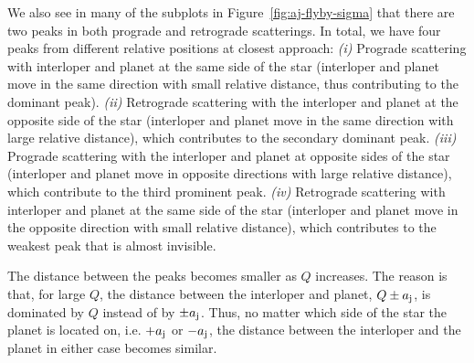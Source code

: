 \documentclass[twocolumn]{aastex63}
\newcommand*\fgr[1]{Figure~\ref{#1}}
\begin{document}
We also see in many of the subplots in \fgr{fig:aj-flyby-sigma} that there are two peaks in both prograde and retrograde scatterings. In total, we have four peaks from different relative positions at closest approach: {\em (i)} Prograde scattering with interloper and planet at the same side of the star (interloper and planet move in the same direction with small relative distance, thus contributing to the dominant peak). {\em (ii)} Retrograde scattering with the interloper and planet at the opposite side of the star (interloper and planet move in the same direction with large relative distance), which contributes to the secondary dominant peak. {\em (iii)} Prograde scattering with the interloper and planet at opposite sides of the star (interloper and planet move in opposite directions with large relative distance), which contribute to the third prominent peak. {\em (iv)} Retrograde scattering with interloper and planet at the same side of the star (interloper and planet move in the opposite direction with small relative distance), which contributes to the weakest peak that is almost invisible.

The distance between the peaks becomes smaller as $Q$ increases. The reason is that, for large $Q$, the distance between the interloper and planet, $Q\pm a_{\rm j}$, is dominated by $Q$ instead of by $\pm a_{\rm j}$. Thus, no matter which side of the star the planet is located on, i.e.  $+a_{\rm j}$ or $-a_{\rm j}$, the distance between the interloper and the planet in either case becomes similar.  
\end{document}

